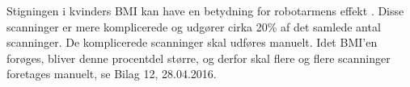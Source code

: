 Stigningen i kvinders BMI kan have en betydning for robotarmens effekt \cite{kvinderovervaegt}. Disse scanninger er mere komplicerede og udgører cirka 20\% af det samlede antal scanninger. De komplicerede scanninger skal udføres manuelt. Idet BMI’en forøges, bliver denne procentdel større, og derfor skal flere og flere scanninger foretages manuelt, se Bilag 12, 28.04.2016. 

